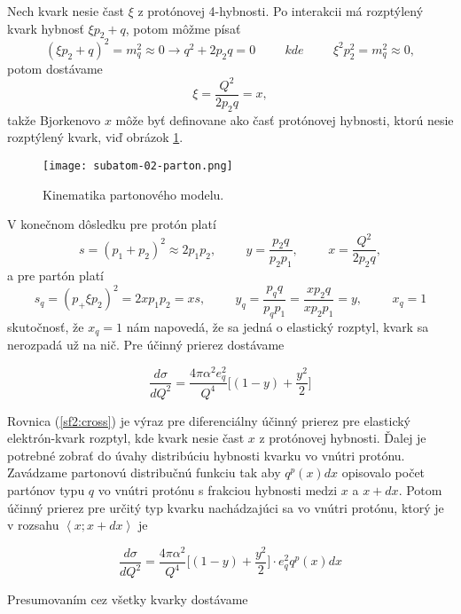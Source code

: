 \documentclass[../../main.tex]{subfiles}
\begin{document}
Nech kvark nesie čast $\xi$ z protónovej 4-hybnosti. Po interakcii má rozptýlený kvark hybnosť $\xi p_2+q$, potom môžme písať
$$ (\xi p_2+q)^2=m^2_q \approx 0 \rightarrow q^2+2p_2q=0 \hspace{1cm} kde \hspace{1cm} \xi^2 p_2^2 = m^2_q \approx 0, $$
potom dostávame $$ \xi = \frac{Q^2}{2p_2q} = x, $$
takže Bjorkenovo $x$ môže byť definovane ako časť protónovej hybnosti, ktorú nesie rozptýlený kvark, viď obrázok \ref{sf2:fig:parton}.

\begin{figure}[!h]
\texttt{[image: subatom-02-parton.png]}
\centering
\caption{Kinematika partonového modelu.}
\label{sf2:fig:parton}
\end{figure}

V konečnom dôsledku pre protón platí
$$ s=(p_1+p_2)^2\approx 2p_1p_2, \hspace{1cm} y=\frac{p_2q}{p_2 p_1}, \hspace{1cm} x=\frac{Q^2}{2p_2q},$$
a pre partón platí
$$ s_q=(p_+\xi p_2)^2=2xp_1p_2=xs, \hspace{1cm} y_q=\frac{p_qq}{p_qp_1}=\frac{xp_2q}{xp_2p_1} = y, \hspace{1cm} x_q=1 $$
skutočnosť, že $x_q=1$ nám napovedá, že sa jedná o elastický rozptyl, kvark sa nerozpadá už na nič. Pre účinný prierez dostávame 

\begin{equation}
\frac{d\sigma}{dQ^2} = \frac{4\pi\alpha^2 e_q^2}{Q^4}\bigg[ (1-y)+\frac{y^2}{2} \bigg]
\label{sf2:cross}
\end{equation}

Rovnica (\ref{sf2:cross}) je výraz pre diferenciálny účinný prierez pre elastický elektrón-kvark rozptyl, kde kvark nesie čast $x$ z protónovej hybnosti. Ďalej je potrebné zobrať do úvahy distribúciu hybnosti kvarku vo vnútri protónu.
Zavádzame partonovú distribučnú funkciu tak aby $q^p(x)dx$ opisovalo počet partónov
typu $q$ vo vnútri protónu s frakciou hybnosti medzi $x$ a $x+dx$. Potom účinný prierez pre určitý typ kvarku nachádzajúci sa vo vnútri protónu, ktorý je v rozsahu $\left\langle x ; x+dx\right\rangle $ je

\begin{equation}
\frac{d\sigma}{dQ^2} = \frac{4\pi\alpha^2}{Q^4}\bigg[ (1-y)+\frac{y^2}{2} \bigg]\cdot e^2_q q^p(x)dx
\label{sf2:cross1}
\end{equation}

Presumovaním cez všetky kvarky dostávame
\end{document}
